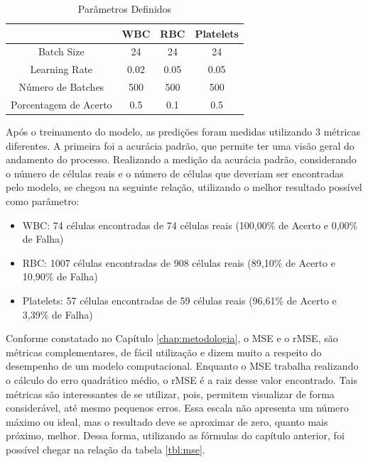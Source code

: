 \begin{table}[!htb]
\centering
\caption{Parâmetros Definidos}
\label{tbl:parametros}
\begin{tabular}{|c|c|c|c|}
\hline
                      & WBC  & RBC  & Platelets \\ \hline
Batch Size            & 24   & 24   & 24        \\ \hline
Learning Rate         & 0.02 & 0.05 & 0.05      \\ \hline
Número de Batches     & 500  & 500  & 500       \\ \hline
Porcentagem de Acerto & 0.5 & 0.1 & 0.5      \\ \hline
\end{tabular}
	\vspace{6pt}
\end{table}

Após o treinamento do modelo, as predições foram medidas utilizando 3 métricas diferentes. A primeira foi a acurácia padrão, que permite ter uma visão geral do andamento do processo. Realizando a medição da acurácia padrão, considerando o número de células reais e o número de células que deveriam ser encontradas pelo modelo, se chegou na seguinte relação, utilizando o melhor resultado possível como parâmetro:

\begin{itemize}
    \item WBC: 74 células encontradas de 74 células reais (100,00\% de Acerto e 0,00\% de Falha)
    \item RBC: 1007 células encontradas de 908 células reais (89,10\% de Acerto e 10,90\% de Falha)
    \item Platelets: 57 células encontradas de 59 células reais (96,61\% de Acerto e 3,39\% de Falha)
\end{itemize}

Conforme constatado no Capítulo \ref{chap:metodologia}, o MSE e o rMSE, são métricas complementares, de fácil utilização e dizem muito a respeito do desempenho de um modelo computacional. Enquanto o MSE trabalha realizando o cálculo do erro quadrático médio, o rMSE é a raiz desse valor encontrado. Tais métricas são interessantes de se utilizar, pois, permitem visualizar de forma considerável, até mesmo pequenos erros. Essa escala não apresenta um número máximo ou ideal, mas o resultado deve se aproximar de zero, quanto mais próximo, melhor. Dessa forma, utilizando as fórmulas do capítulo anterior, foi possível chegar na relação da tabela \ref{tbl:mse}.


